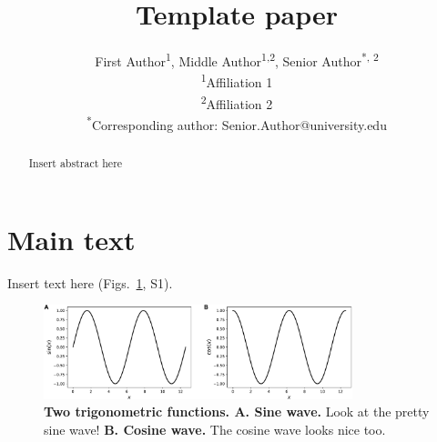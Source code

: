 \documentclass[10pt]{article}
\title{Template paper}
\author{First Author\textsuperscript{1}, Middle Author\textsuperscript{1,2}, Senior Author\textsuperscript{*, 2}\\\textsuperscript{1}Affiliation 1\\\textsuperscript{2}Affiliation 2\\\textsuperscript{*}Corresponding author: Senior.Author@university.edu}
\date{}
\newcommand{\demo}{S1}
\begin{document}
\maketitle

\begin{abstract}
Insert abstract here
\end{abstract}


\section*{Main text}
Insert text here (Figs.~\ref{fig:demo}, \demo).

\begin{figure}[tp]
\centering
\includegraphics[width=0.8\textwidth]{figs/trig}
\caption{\textbf{Two trigonometric functions.  A. Sine wave.} Look at the pretty sine wave!  \textbf{B. Cosine wave.}  The cosine wave looks nice too.}
\label{fig:demo}
\end{figure}



\end{document}

